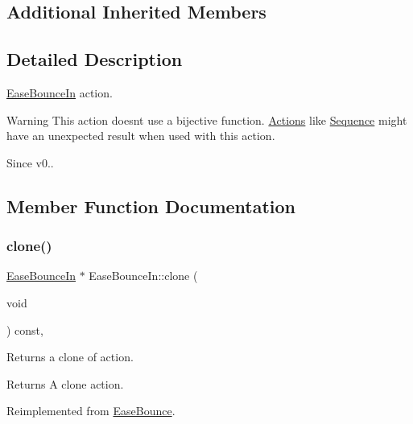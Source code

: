 \subsection*{Additional Inherited Members}


\subsection{Detailed Description}
\hyperlink{classEaseBounceIn}{Ease\+Bounce\+In} action. 

\begin{DoxyWarning}{Warning}
This action doesn\textquotesingle{}t use a bijective function. \hyperlink{classActions}{Actions} like \hyperlink{classSequence}{Sequence} might have an unexpected result when used with this action. 
\end{DoxyWarning}
\begin{DoxySince}{Since}
v0.. 
\end{DoxySince}


\subsection{Member Function Documentation}
\mbox{\label{classEaseBounceIn_a36d193006cd57d915b764a7fc52d2768}} 
\subsubsection{\texorpdfstring{clone()}{clone()}}
{\footnotesize\ttfamily \hyperlink{classEaseBounceIn}{Ease\+Bounce\+In} $\ast$ Ease\+Bounce\+In\+::clone (\begin{DoxyParamCaption}\item[{void}]{ }\end{DoxyParamCaption}) const\hspace{0.3cm}{\ttfamily [override]}, {\ttfamily [virtual]}}

Returns a clone of action.

\begin{DoxyReturn}{Returns}
A clone action. 
\end{DoxyReturn}


Reimplemented from \hyperlink{classEaseBounce_a3a39e9fa829cc40be5f2114787a98db6}{Ease\+Bounce}.

\mbox{\label{classEaseBounceIn_aa61493b1bd655620559bf40e73b96f57}} 
